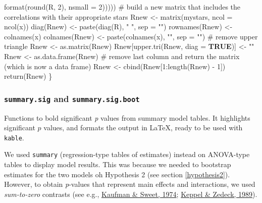 \documentclass[
  bookmarksnumbered]{article}
\newenvironment{Shaded}{\begin{snugshade}}{\end{snugshade}}
\newcommand{\AttributeTok}[1]{\textcolor[rgb]{0.80,0.80,0.80}{#1}}
\newcommand{\CommentTok}[1]{\textcolor[rgb]{0.50,0.62,0.50}{#1}}
\newcommand{\ConstantTok}[1]{\textcolor[rgb]{0.86,0.64,0.64}{\textbf{#1}}}
\newcommand{\DecValTok}[1]{\textcolor[rgb]{0.86,0.86,0.80}{#1}}
\newcommand{\FunctionTok}[1]{\textcolor[rgb]{0.94,0.94,0.56}{#1}}
\newcommand{\NormalTok}[1]{\textcolor[rgb]{0.80,0.80,0.80}{#1}}
\newcommand{\OtherTok}[1]{\textcolor[rgb]{0.94,0.94,0.56}{#1}}
\newcommand{\SpecialCharTok}[1]{\textcolor[rgb]{0.86,0.64,0.64}{#1}}
\newcommand{\StringTok}[1]{\textcolor[rgb]{0.80,0.58,0.58}{#1}}
\begin{document}
\begin{Shaded}
\begin{Highlighting}[]
                                         \FunctionTok{format}\NormalTok{(}\FunctionTok{round}\NormalTok{(R, }\DecValTok{2}\NormalTok{), }\AttributeTok{nsmall =} \DecValTok{2}\NormalTok{)))))}
  \CommentTok{\# build a new matrix that includes the correlations with their appropriate stars}
\NormalTok{  Rnew }\OtherTok{\textless{}{-}} \FunctionTok{matrix}\NormalTok{(mystars, }
                 \AttributeTok{ncol =} \FunctionTok{ncol}\NormalTok{(x))}
  \FunctionTok{diag}\NormalTok{(Rnew) }\OtherTok{\textless{}{-}} \FunctionTok{paste}\NormalTok{(}\FunctionTok{diag}\NormalTok{(R), }\StringTok{" "}\NormalTok{, }
                      \AttributeTok{sep =} \StringTok{""}\NormalTok{)}
  \FunctionTok{rownames}\NormalTok{(Rnew) }\OtherTok{\textless{}{-}} \FunctionTok{colnames}\NormalTok{(x)}
  \FunctionTok{colnames}\NormalTok{(Rnew) }\OtherTok{\textless{}{-}} \FunctionTok{paste}\NormalTok{(}\FunctionTok{colnames}\NormalTok{(x), }\StringTok{""}\NormalTok{, }
                          \AttributeTok{sep =} \StringTok{""}\NormalTok{)}
  \CommentTok{\# remove upper triangle}
\NormalTok{  Rnew }\OtherTok{\textless{}{-}} \FunctionTok{as.matrix}\NormalTok{(Rnew)}
\NormalTok{  Rnew[}\FunctionTok{upper.tri}\NormalTok{(Rnew, }\AttributeTok{diag =} \ConstantTok{TRUE}\NormalTok{)] }\OtherTok{\textless{}{-}} \StringTok{""}
\NormalTok{  Rnew }\OtherTok{\textless{}{-}} \FunctionTok{as.data.frame}\NormalTok{(Rnew)}
  \CommentTok{\# remove last column and return the matrix (which is now a data frame)}
\NormalTok{  Rnew }\OtherTok{\textless{}{-}} \FunctionTok{cbind}\NormalTok{(Rnew[}\DecValTok{1}\SpecialCharTok{:}\FunctionTok{length}\NormalTok{(Rnew) }\SpecialCharTok{{-}} \DecValTok{1}\NormalTok{])}
  \FunctionTok{return}\NormalTok{(Rnew)}
\NormalTok{\}}
\end{Highlighting}
\end{Shaded}

\hypertarget{summary.sig-and-summary.sig.boot}{%
\subsubsection{\texorpdfstring{\texttt{summary.sig} and \texttt{summary.sig.boot}}{summary.sig and summary.sig.boot}}\label{summary.sig-and-summary.sig.boot}}

Functions to bold significant \emph{p} values from summary model tables. It highlights significant \(p\) values, and formats the output in \LaTeX, ready to be used with \texttt{kable}.

We used \texttt{summary} (regression-type tables of estimates) instead on ANOVA-type tables to display model results. This was because we needed to bootstrap estimates for the two models oh Hypothesis 2 (see section \ref{hypothesis2}). However, to obtain \emph{p}-values that represent main effects and interactions, we used \emph{sum-to-zero} contrasts (see e.g., \protect\hyperlink{ref-kaufmanContrastCodingLeast1974}{Kaufman \& Sweet, 1974}; \protect\hyperlink{ref-keppelDataAnalysisResearch1989}{Keppel \& Zedeck, 1989}).
\end{document}
